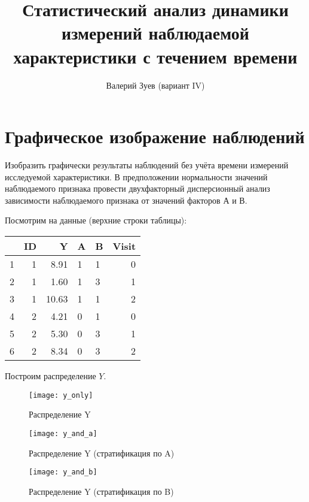 \documentclass[a4paper,12pt]{article}
\begin{document}
\title{ Статистический анализ динамики измерений наблюдаемой характеристики с течением времени }
\author{Валерий Зуев (вариант IV)}
\maketitle

\setcounter{section}{1}
\section{ Графическое изображение наблюдений }

\begin{leftbar}
Изобразить графически результаты наблюдений без учёта времени измерений исследуемой характеристики.
В предположении нормальности значений наблюдаемого признака провести двухфакторный дисперсионный анализ зависимости наблюдаемого признака от значений факторов А и В.
\end{leftbar}

Посмотрим на данные (верхние строки таблицы):

\begin{table}[ht]
	\centering
	\begin{tabular}{rrrllr}
		\hline
		& ID & Y & A & B & Visit \\
		\hline
		1 &   1 & 8.91 & 1 & 1 &   0 \\
		2 &   1 & 1.60 & 1 & 3 &   1 \\
		3 &   1 & 10.63 & 1 & 1 &   2 \\
		4 &   2 & 4.21 & 0 & 1 &   0 \\
		5 &   2 & 5.30 & 0 & 3 &   1 \\
		6 &   2 & 8.34 & 0 & 3 &   2 \\
		\hline
	\end{tabular}
\end{table}

Построим распределение $ Y $.

\begin{figure}[H]
	\label{img:data_no_time}
	\texttt{[image: y\_only]}
	\caption{Распределение Y}
\end{figure}

\begin{figure}[H]
    \texttt{[image: y\_and\_a]}
    \caption{Распределение Y (стратификация по A)}
\end{figure}
\begin{figure}[H]
    \texttt{[image: y\_and\_b]}
    \caption{Распределение Y (стратификация по B)}
\end{figure}
\end{document}
